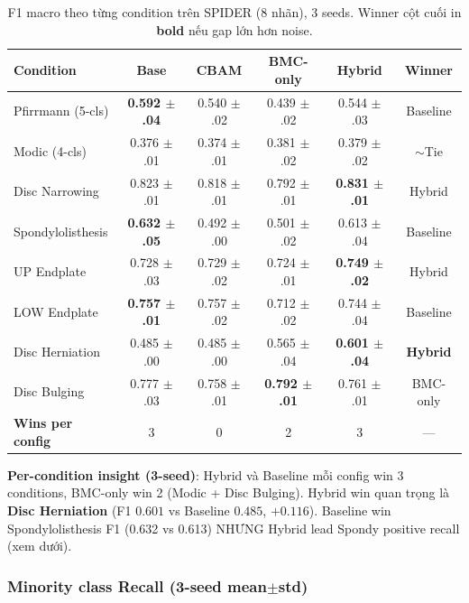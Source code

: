 \documentclass[11pt,a4paper]{article}
\newcommand{\best}[1]{\textcolor{best}{\textbf{#1}}}
\begin{document}
\begin{table}[h]
\centering
\caption{F1 macro theo từng condition trên SPIDER (8 nhãn), 3 seeds.
Winner cột cuối in \best{bold} nếu gap lớn hơn noise.}
\label{tab:spider_perclass_f1}
\small
\begin{tabular}{@{}lccccc@{}}
\toprule
\rowcolor{tablehdr}
Condition & Base & CBAM & BMC-only & Hybrid & Winner \\
\midrule
Pfirrmann (5-cls)    & \best{0.592 $\pm$ .04} & 0.540 $\pm$ .02 & 0.439 $\pm$ .02 & 0.544 $\pm$ .03 & Baseline \\
Modic (4-cls)        & 0.376 $\pm$ .01 & 0.374 $\pm$ .01 & 0.381 $\pm$ .02 & 0.379 $\pm$ .02 & ${\sim}$Tie \\
Disc Narrowing       & 0.823 $\pm$ .01 & 0.818 $\pm$ .01 & 0.792 $\pm$ .01 & \best{0.831 $\pm$ .01} & Hybrid \\
Spondylolisthesis    & \best{0.632 $\pm$ .05} & 0.492 $\pm$ .00 & 0.501 $\pm$ .02 & 0.613 $\pm$ .04 & Baseline \\
UP Endplate          & 0.728 $\pm$ .03 & 0.729 $\pm$ .02 & 0.724 $\pm$ .01 & \best{0.749 $\pm$ .02} & Hybrid \\
LOW Endplate         & \best{0.757 $\pm$ .01} & 0.757 $\pm$ .02 & 0.712 $\pm$ .02 & 0.744 $\pm$ .04 & Baseline \\
Disc Herniation      & 0.485 $\pm$ .00 & 0.485 $\pm$ .00 & 0.565 $\pm$ .04 & \best{0.601 $\pm$ .04} & \textbf{Hybrid} \\
Disc Bulging         & 0.777 $\pm$ .03 & 0.758 $\pm$ .01 & \best{0.792 $\pm$ .01} & 0.761 $\pm$ .01 & BMC-only \\
\midrule
\textbf{Wins per config} & 3 & 0 & 2 & 3 & --- \\
\bottomrule
\end{tabular}
\end{table}

\noindent\textbf{Per-condition insight (3-seed)}: Hybrid và Baseline
mỗi config win 3 conditions, BMC-only win 2 (Modic + Disc Bulging).
Hybrid win quan trọng là \textbf{Disc Herniation} (F1 $0.601$ vs
Baseline $0.485$, $+0.116$). Baseline win Spondylolisthesis F1
(0.632 vs 0.613) NHƯNG Hybrid lead Spondy positive recall (xem dưới).

\subsubsection*{Minority class Recall (3-seed mean$\pm$std)}
\end{document}
